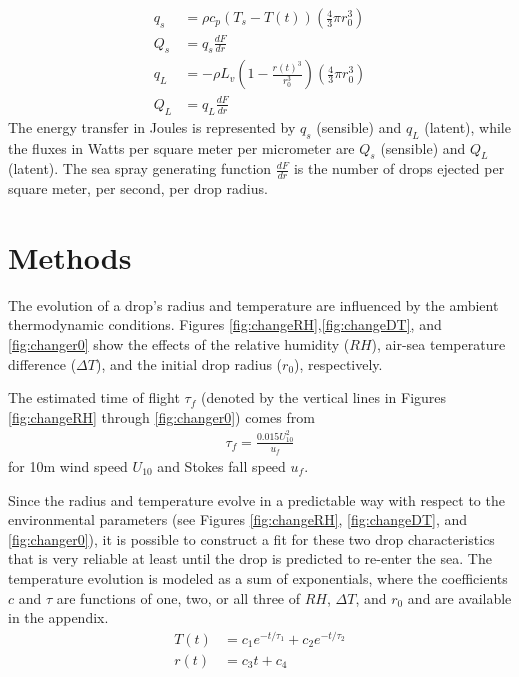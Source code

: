 \documentclass[10pt,a4paper]{article}
\begin{document}
\begin{align}
q_s &= \rho c_p \left(T_s - T(t)\right)\left(\frac{4}{3}\pi r_0^3\right)\\
Q_s &= q_s \frac{dF}{dr}\label{eq:Qs}\\
q_L &= -\rho L_v \left(1 - \frac{r(t)^3}{r_0^3}\right)\left(\frac{4}{3}\pi r_0^3\right)\\
Q_L &= q_L \frac{dF}{dr}\label{eq:QL}
\end{align}
The energy transfer in Joules is represented by $q_s$ (sensible) and $q_L$ (latent), while the fluxes in Watts per square meter per micrometer are $Q_s$ (sensible) and $Q_L$ (latent). The sea spray generating function $\frac{dF}{dr}$ is the number of drops ejected per square meter, per second, per drop radius. \par 

\section{Methods}
The evolution of a drop's radius and temperature are influenced by the ambient thermodynamic conditions. Figures \ref{fig:changeRH},\ref{fig:changeDT}, and \ref{fig:changer0} show the effects of the relative humidity ($RH$), air-sea temperature difference ($\Delta T$), and the initial drop radius ($r_0$), respectively. \par 
The estimated time of flight $\tau_f$ (denoted by the vertical lines in Figures \ref{fig:changeRH} through \ref{fig:changer0}) comes from \citet{Andreas1992} 
\begin{align}
\tau_f = \frac{0.015 U_{10}^2}{u_f} \label{eq:tauf}
\end{align}
for 10m wind speed $U_{10}$ and Stokes fall speed $u_f$. \par 
Since the radius and temperature evolve in a predictable way with respect to the environmental parameters (see Figures \ref{fig:changeRH}, \ref{fig:changeDT}, and \ref{fig:changer0}), it is possible to construct a fit for these two drop characteristics that is very reliable at least until the drop is predicted to re-enter the sea. The temperature evolution is modeled as a sum of exponentials, where the coefficients $c$ and $\tau$ are functions of one, two, or all three of $RH$, $\Delta T$, and $r_0$ and are available in the appendix.
\begin{align}
T(t) &= c_1e^{-t/\tau_1}+c_2e^{-t/\tau_2} \label{eq:T_est}\\
r(t) &= c_3 t + c_4 \label{eq:r_est}
\end{align}
 
\end{document}
